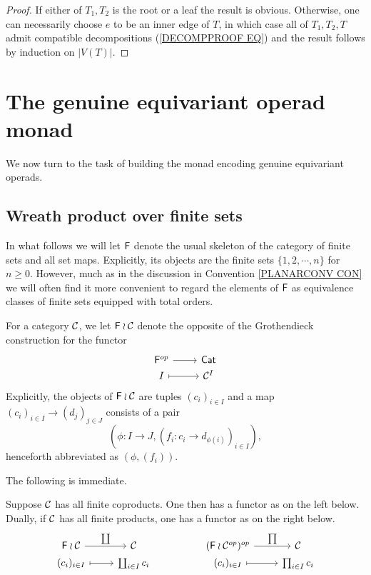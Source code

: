 \documentclass[a4paper,10pt]{article}%
\begin{document}
\begin{proof}
	If either of $T_1,T_2$ is the root or a leaf the result is obvious. Otherwise, one can necessarily choose $e$ to be an inner edge of $T$, in which case all of $T_1,T_2,T$ admit compatible decompositions (\ref{DECOMPPROOF EQ}) and the result follows by induction on $|V(T)|$.
\end{proof}



\section{The genuine equivariant operad monad}

We now turn to the task of building the monad encoding genuine equivariant operads.



\subsection{Wreath product over finite sets}

In what follows we will let $\mathsf{F}$ denote the usual skeleton of the category of finite sets and all set maps. Explicitly, its objects are the finite sets $\{1,2,\cdots,n\}$ for $n\geq 0$.
However, much as in the discussion in 
Convention \ref{PLANARCONV CON} we will often find it more convenient to regard the elements of $\mathsf{F}$ as equivalence classes of finite sets equipped with total orders.
 

\begin{definition}
	For a category $\mathcal{C}$, we let $\mathsf{F} \wr \mathcal{C}$ denote the opposite of the Grothendieck construction for the functor
\[
\begin{tikzcd}[row sep=0pt]
	\Fin^{op} \ar{r} & \mathsf{Cat}
\\
	I \ar[r,mapsto] & \C^I
\end{tikzcd}	
 \]
Explicitly, the objects of $\mathsf{F} \wr \mathcal{C}$ are tuples $(c_i)_{i \in I}$ and a map 
$(c_i)_{i \in I} \to (d_j)_{j \in J}$ consists of a pair 
\[(\phi \colon I \to J, (f_i\colon c_i \to d_{\phi(i)})_{i\in I}),\]
 henceforth abbreviated as $(\phi,(f_i))$.
\end{definition}
 
 The following is immediate.

\begin{proposition}
	Suppose $\mathcal{C}$ has all finite coproducts. One then has a functor as on the left below.
Dually, if $\mathcal{C}$ has all finite products, one has a functor as on the right below.
\[
\begin{tikzcd}[row sep=0pt]
	\Fin \wr \C \ar{r}{\coprod} & \C & &
	(\Fin \wr \C^{op})^{op} \ar{r}{\prod} & \C
\\
	(c_i)_{i \in I} \ar[mapsto]{r} & \coprod_{i \in I}{c_i} & &
	(c_i)_{i \in I} \ar[mapsto]{r} & \prod_{i \in I}{c_i}
\end{tikzcd}
\]
\end{proposition}
\end{document}
